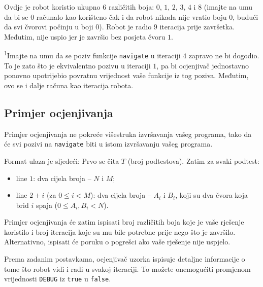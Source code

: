 \documentclass[12pt]{article}
\begin{document}
Ovdje je robot koristio ukupno $6$ različitih boja: $0$, $1$, $2$, $3$, $4$ i $8$ (imajte na umu da bi se $0$ računalo kao korišteno čak i da robot nikada nije vratio boju $0$, budući da svi čvorovi počinju u boji $0$). Robot je radio $9$ iteracija prije završetka. Međutim, nije uspio jer je završio bez posjeta čvoru $1$.

\textsuperscript{1}Imajte na umu da se poziv funkcije \texttt{navigate} u iteraciji $4$ zapravo ne bi dogodio. To je zato što je ekvivalentno pozivu u iteraciji $1$, pa bi ocjenjivač jednostavno ponovno upotrijebio povratnu vrijednost vaše funkcije iz tog poziva. Međutim, ovo se i dalje računa kao iteracija robota.

\subsection{Primjer ocjenjivanja}

Primjer ocjenjivanja ne pokreće višestruka izvršavanja vašeg programa, tako da će svi pozivi na \texttt{navigate} biti u istom izvršavanju vašeg programa.

Format ulaza je sljedeći: Prvo se čita $T$ (broj podtestova). Zatim za svaki podtest:
\begin{itemize}
\item line $1$: dva cijela broja -- $N$ i $M$;
\item line $2+i$ (za $0 \leq i < M$): dva cijela broja -- $A_i$ i $B_i$, koji su dva čvora koja brid $i$ spaja ($0 \leq A_i, B_i < N$).
\end{itemize}

Primjer ocjenjivanja će zatim ispisati broj različitih boja koje je vaše rješenje koristilo i broj iteracija koje su mu bile potrebne prije nego što je završilo. Alternativno, ispisati će poruku o pogrešci ako vaše rješenje nije uspjelo.

Prema zadanim postavkama, ocjenjivač uzorka ispisuje detaljne informacije o tome što robot vidi i radi u svakoj iteraciji. To možete onemogućiti promjenom vrijednosti \texttt{DEBUG} iz \texttt{true} u \texttt{false}.
\end{document}
